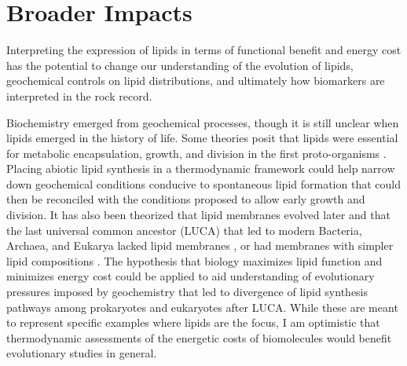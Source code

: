 
\section{Broader Impacts}

Interpreting the expression of lipids in terms of functional benefit and energy cost has the potential to change our understanding of the evolution of lipids, geochemical controls on lipid distributions, and ultimately how biomarkers are interpreted in the rock record.

Biochemistry emerged from geochemical processes, though it is still unclear when lipids emerged in the history of life. Some theories posit that lipids were essential for metabolic encapsulation, growth, and division in the first proto-organisms \citep{deamer2002first, luisi2016emergence}. Placing abiotic lipid synthesis in a thermodynamic framework could help narrow down geochemical conditions conducive to spontaneous lipid formation that could then be reconciled with the conditions proposed to allow early growth and division. It has also been theorized that lipid membranes evolved later and that the last universal common ancestor (LUCA) that led to modern Bacteria, Archaea, and Eukarya lacked lipid membranes \citep{koga1998did, martin2003origins}, or had membranes with simpler lipid compositions \citep{sojo2014bioenergetic}. The hypothesis that biology maximizes lipid function and minimizes energy cost could be applied to aid understanding of evolutionary pressures imposed by geochemistry that led to divergence of lipid synthesis pathways among prokaryotes and eukaryotes after LUCA. While these are meant to represent specific examples where lipids are the focus, I am optimistic that thermodynamic assessments of the energetic costs of biomolecules would benefit evolutionary studies in general.



